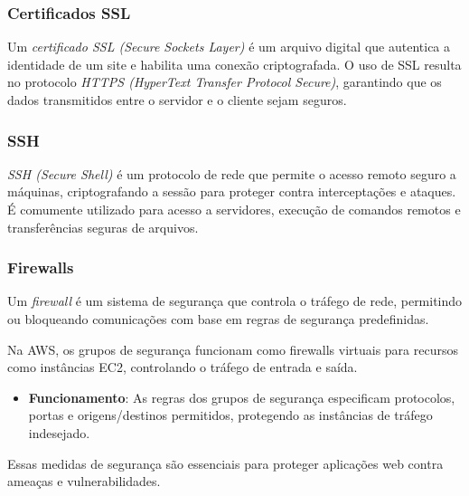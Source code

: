 \subsubsection{Certificados SSL}

Um \emph{certificado SSL (Secure Sockets Layer)} é um arquivo digital que autentica a identidade de um site e habilita uma conexão criptografada. O uso de SSL resulta no protocolo \emph{HTTPS (HyperText Transfer Protocol Secure)}, garantindo que os dados transmitidos entre o servidor e o cliente sejam seguros.

\subsubsection{SSH}

\emph{SSH (Secure Shell)} é um protocolo de rede que permite o acesso remoto seguro a máquinas, criptografando a sessão para proteger contra interceptações e ataques. É comumente utilizado para acesso a servidores, execução de comandos remotos e transferências seguras de arquivos.

\subsubsection{Firewalls}


Um \emph{firewall} é um sistema de segurança que controla o tráfego de rede, permitindo ou bloqueando comunicações com base em regras de segurança predefinidas.

Na AWS, os grupos de segurança funcionam como firewalls virtuais para recursos como instâncias EC2, controlando o tráfego de entrada e saída.

\begin{itemize}
    \item \textbf{Funcionamento}: As regras dos grupos de segurança especificam protocolos, portas e origens/destinos permitidos, protegendo as instâncias de tráfego indesejado.
\end{itemize}

Essas medidas de segurança são essenciais para proteger aplicações web contra ameaças e vulnerabilidades.









